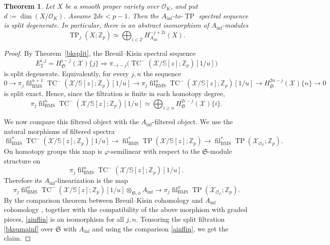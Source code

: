 \documentclass[11pt]{amsart}
\newtheorem{theorem}[lemma]{Theorem}
\numberwithin{equation}{section}
\newcommand{\Z}{\mathbb{Z}}
\newcommand{\sC}{\mathcal{C}}
\newcommand{\sO}{\mathcal{O}}
\newcommand{\sX}{\mathcal{X}}
\newcommand{\mf}{\mathfrak}
\newcommand{\fil}{{\operatorname{fil}}}
\newcommand{\BMS}{\mathrm{BMS}}
\newcommand{\mS}{\mf{S}}
\numberwithin{equation}{section}
\newcommand{\ol}{\overline}
\newcommand{\Ainf}{A_{\operatorname{inf}}}
\newcommand{\TP}{\operatorname{TP}}
\newcommand{\TCn}{\operatorname{TC}^{-}}
\newcommand{\bS}{\mathbb{S}}
\begin{document}
\begin{theorem}\label{ainftpsplit}
 Let $X$ be a smooth proper variety over $\sO_K$, and put $d:=\dim(X/\sO_K)$. Assume $2de<p-1$. Then the $\Ainf$-to-$\TP$ spectral sequence is split degenerate. In
  particular, there is an abstract isomorphism of $\Ainf$-modules
  \[
    \TP_j(X;\Z_p)
    \simeq
    \bigoplus_{i\in \Z}
    H_{\Ainf}^{-j+2i}(X).
  \]
\end{theorem}
\begin{proof}
By Theorem~\ref{bksplit}, the Breuil--Kisin spectral sequence
\begin{equation}\label{bkssainf}
  E_2^{i,j}
  =
  H_{\mS}^{i-j}(\sX)\{j\}
  \Longrightarrow
  \pi_{-i-j}\bigl(
    \TCn(\sX/\bS[z];\Z_p)[1/u]
  \bigr)
\end{equation}
is split degenerate. Equivalently, for every $j,n$ the sequence
\[
  0
  \to
  \pi_j\fil_{\BMS}^{n+1}
  \TCn(\sX/\bS[z];\Z_p)[1/u]
  \to
  \pi_j\fil_{\BMS}^{n}
  \TCn(\sX/\bS[z];\Z_p)[1/u]
  \to
  H_{\mS}^{2n-j}(\sX)\{n\}
  \to
  0
\]
is split exact. Hence, since the filtration is finite in each homotopy
degree,
\begin{equation}\label{bksumainf}
  \pi_j\fil_{\BMS}^{n}
  \TCn(\sX/\bS[z];\Z_p)[1/u]
  \simeq
  \bigoplus_{i\geq n}
  H_{\mS}^{2i-j}(\sX)\{i\}.
\end{equation}

We now compare this filtered object with the $\Ainf$-filtered object. We use
the natural morphisms of filtered spectra
\[
  \fil_{\BMS}^{*}
  \TCn(\sX/\bS[z];\Z_p)[1/u]
  \longrightarrow
  \fil_{\BMS}^{*}
  \TP(\sX/\bS[z];\Z_p)
  \longrightarrow
  \fil_{\BMS}^{*}
  \TP(\sX_{\sO_{\sC}};\Z_p).
\]
On homotopy groups this map is $\varphi$-semilinear with respect to the
$\mS$-module structure on
\[
  \pi_j\fil_{\BMS}^{n}
  \TCn(\sX/\bS[z];\Z_p)[1/u].
\]
Therefore its $\Ainf$-linearization is the map
\begin{equation}\label{ainflin}
  \pi_j\fil_{\BMS}^{n}
  \TCn(\sX/\bS[z];\Z_p)[1/u]
  \otimes_{\mS,\ol{\phi}}\Ainf
  \longrightarrow
  \pi_j\fil_{\BMS}^{n}
  \TP(\sX_{\sO_{\sC}};\Z_p).
\end{equation}
By the comparison theorem between Breuil--Kisin cohomology and $\Ainf$
cohomology \cite[Theorem 1.2]{BMS19}, together with the compatibility of the above morphism with
graded pieces, \eqref{ainflin} is an isomorphism for
all $j,n$. Tensoring the split filtration \eqref{bksumainf} over
$\mS$ with $\Ainf$ and using the comparison
\eqref{ainflin}, we get the claim.
\end{proof}
\end{document}
